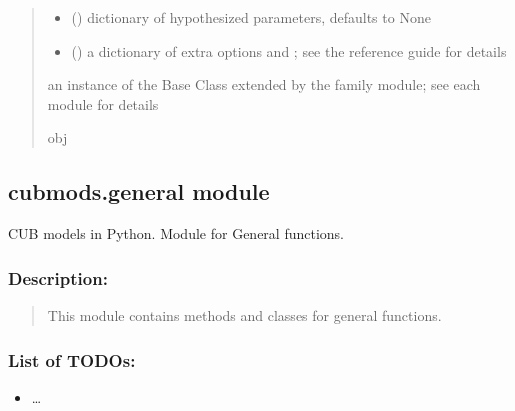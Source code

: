 \documentclass[letterpaper,10pt,english]{sphinxmanual}
\begin{document}
\begin{fulllineitems}
\begin{quote}
\begin{description}
\begin{itemize}
\item {} 
\sphinxAtStartPar
{} (\sphinxstyleliteralemphasis{\sphinxupquote{, }}) \textendash{} dictionary of hypothesized parameters, defaults to None

\item {} 
\sphinxAtStartPar
{} () \textendash{} a dictionary of extra options  and ; see the reference
guide for details

\end{itemize}

\sphinxAtStartPar
an instance of the Base Class  extended by the family module;
see each module for details

\sphinxAtStartPar
obj

\end{description}\end{quote}

\end{fulllineitems}



\subsection{cubmods.general module}
\label{\detokenize{cubmods:module-cubmods.general}}\label{\detokenize{cubmods:cubmods-general-module}}
\sphinxAtStartPar
CUB models in Python.
Module for General functions.


\subsubsection{Description:}
\label{\detokenize{cubmods:id73}}\begin{quote}

\sphinxAtStartPar
This module contains methods and classes
for general functions.
\end{quote}


\subsubsection{List of TODOs:}
\label{\detokenize{cubmods:id74}}\begin{itemize}
\item {} 
\sphinxAtStartPar
…

\end{itemize}
\end{document}
